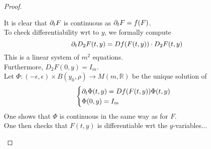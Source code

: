 \documentclass[../main.tex]{subfiles}
\begin{document}
\begin{proof}
\begin{enumerate}
	It is clear that $\partial_t F$ is continuous as $\partial_t F = f( F) $.\\
	To check differentiability wrt to $y$, we formally compute
	\[ 
	\partial_t D_2F( t,y) = Df( F( t,y) ) \cdot D_2F( t,y) 
	\]
This is a linear system of $m^{2}$ equations.\\
Furthermore, $D_2 F( 0,y) = I_m $.\\
Let $\Phi: ( -\epsilon,\epsilon) \times B( y_0, \rho) \to M( m, \mathbb{R}) $ be the unique solution of
\[ 
\begin{cases}
\partial_t \Phi( t,y) = Df( F( t,y) ) \Phi( t,y) \\
\Phi( 0,y) = I_m
\end{cases}
\]
One shows that $\Phi$ is continuous in the same way as for $F$.\\
One then checks that $F( t,y) $ is differentiable wrt the $y$-variables...
	
\end{enumerate}

\end{proof}
\end{document}
